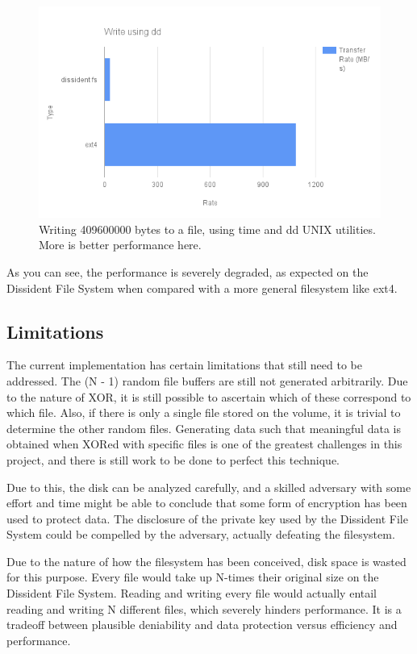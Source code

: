 \documentclass[10pt,twocolumn]{article}
\begin{document}
\begin{figure}[thpb]
  \centering
  	\includegraphics[width=\columnwidth]{dd_write}
    \caption{Writing 409600000 bytes to a file, using time and dd UNIX utilities. More is better performance here.}
	\label{fig:ddwrite}
\end{figure}

As you can see, the performance is severely degraded, as expected on the Dissident File System when compared with a more general filesystem like ext4. 

\subsection{Limitations}

The current implementation has certain limitations that still need to be addressed. The (N - 1) random file buffers are still not generated arbitrarily. Due to the nature of XOR, it is still possible to ascertain which of these correspond to which file. Also, if there is only a single file stored on the volume, it is trivial to determine the other random files. Generating data such that meaningful data is obtained when XORed with specific files is one of the greatest challenges in this project, and there is still work to be done to perfect this technique. 

Due to this, the disk can be analyzed carefully, and a skilled adversary with some effort and time might be able to conclude that some form of encryption has been used to protect data. The disclosure of the private key used by the Dissident File System could be compelled by the adversary, actually defeating the filesystem. 

Due to the nature of how the filesystem has been conceived, disk space is wasted for this purpose. Every file would take up N-times their original size on the Dissident File System. Reading and writing every file would actually entail reading and writing N different files, which severely hinders performance. It is a tradeoff between plausible deniability and data protection versus efficiency and performance. 
\end{document}
